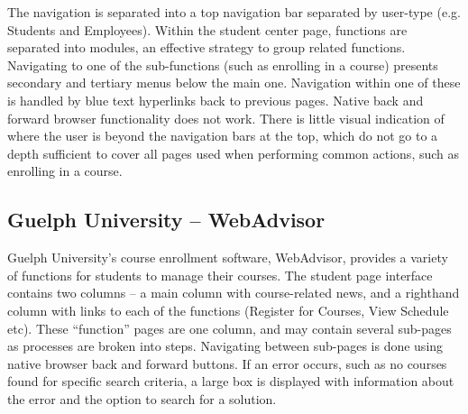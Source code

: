 \documentclass[10pt]{article}
\newenvironment{InlineColumnFigure}
{\par\medskip\noindent\minipage{\linewidth}}
{\endminipage\par\medskip}
\newcommand{\Caption}[1]
{\vspace{-4mm}\fontsize{9}{9}\textbf{Figure \refstepcounter{figCounter} 
\arabic{figCounter}: #1}}
\newcounter{figCounter}
\begin{document}
\begin{multicols}{2}
The navigation is separated into a top navigation bar separated by user-type 
(e.g. Students and Employees). Within the student center page, functions are 
separated into modules, an effective strategy to group related functions. 
Navigating to one of the sub-functions (such as enrolling in a course) presents 
secondary and tertiary menus below the main one. Navigation within one of these 
is handled by blue text hyperlinks back to previous pages. Native back and 
forward browser functionality does not work. There is little visual indication 
of where the user is beyond the navigation bars at the top, which do not go to a 
depth sufficient to cover all pages used when performing common actions, such as 
enrolling in a course.

\subsection*{Guelph University -- WebAdvisor}
Guelph University's course enrollment software, WebAdvisor, provides a variety 
of functions for students to manage their courses. The student page interface 
contains two columns -- a main column with course-related news, and a righthand 
column with links to each of the functions (Register for Courses, View Schedule 
etc). These ``function'' pages are one column, and may contain several sub-pages 
as processes are broken into steps. Navigating between sub-pages is done using 
native browser back and forward buttons. If an error occurs, such as no courses 
found for specific search criteria, a large box is displayed with information 
about the error and the option to search for a solution.



\end{multicols}
\end{document}
